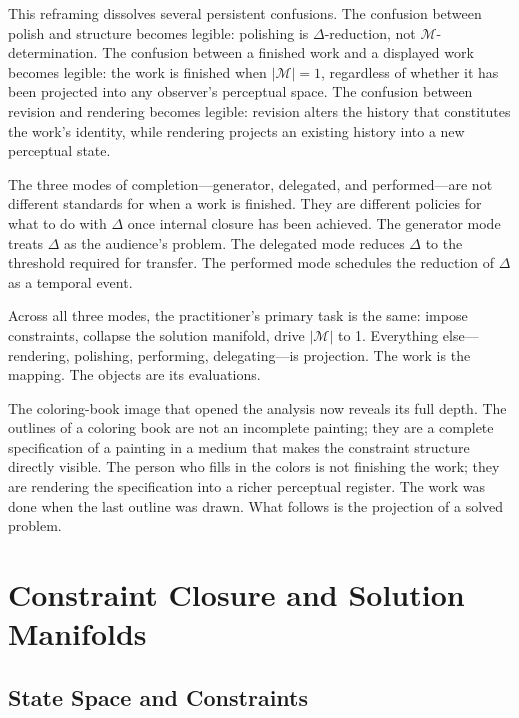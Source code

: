 \documentclass[11pt, twoside]{article}
\theoremstyle{plain}
\theoremstyle{definition}
\theoremstyle{remark}
\begin{document}
This reframing dissolves several persistent confusions. The confusion between polish and structure becomes legible: polishing is $\Delta$-reduction, not $\mathcal{M}$-determination. The confusion between a finished work and a displayed work becomes legible: the work is finished when $|\mathcal{M}| = 1$, regardless of whether it has been projected into any observer's perceptual space. The confusion between revision and rendering becomes legible: revision alters the history that constitutes the work's identity, while rendering projects an existing history into a new perceptual state.

The three modes of completion---generator, delegated, and performed---are not different standards for when a work is finished. They are different policies for what to do with $\Delta$ once internal closure has been achieved. The generator mode treats $\Delta$ as the audience's problem. The delegated mode reduces $\Delta$ to the threshold required for transfer. The performed mode schedules the reduction of $\Delta$ as a temporal event.

Across all three modes, the practitioner's primary task is the same: impose constraints, collapse the solution manifold, drive $|\mathcal{M}|$ to 1. Everything else---rendering, polishing, performing, delegating---is projection. The work is the mapping. The objects are its evaluations.

The coloring-book image that opened the analysis now reveals its full depth. The outlines of a coloring book are not an incomplete painting; they are a complete specification of a painting in a medium that makes the constraint structure directly visible. The person who fills in the colors is not finishing the work; they are rendering the specification into a richer perceptual register. The work was done when the last outline was drawn. What follows is the projection of a solved problem.

\appendix
\renewcommand{\thesection}{\Alph{section}}

\section{Constraint Closure and Solution Manifolds}
\label{app:closure}

\subsection{State Space and Constraints}
\end{document}
